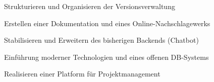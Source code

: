 \begin{frame}
\begin{block}{}
	Strukturieren und Organisieren der Versionsverwaltung
\end{block}
\begin{block}{}
	Erstellen einer Dokumentation und eines Online-Nachschlagewerks
\end{block}
\begin{block}{}
	Stabilisieren und Erweitern des bisherigen Backends (Chatbot)
\end{block}
\begin{block}{}
	Einführung moderner Technologien und eines offenen DB-Systems
\end{block}
\begin{block}{}
	Realisieren einer Platform für Projektmanagement
\end{block}
\end{frame}